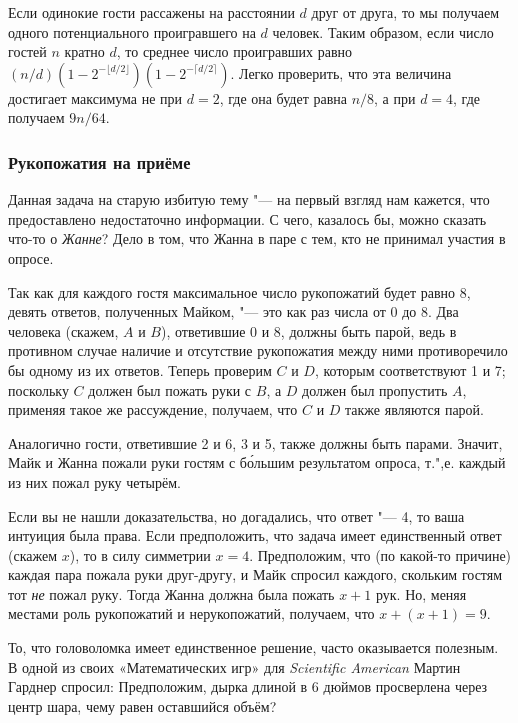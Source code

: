 \documentclass[twoside]{book}
\begin{document}
Если одинокие гости рассажены на расстоянии $d$ друг от друга, то мы получаем одного потенциального проигравшего на $d$ человек.
Таким образом, если число гостей $n$ кратно $d$, то среднее число проигравших равно $(n/d)(1-2^{-\lfloor d/2\rfloor})(1-2^{-\lceil d/2\rceil})$.
Легко проверить, что эта величина достигает максимума не при $d=2$, где она будет равна $n/8$, а при $d=4$, где получаем $9n/64$.
\heart

\subsubsection*{Рукопожатия на приёме}%

Данная задача на старую избитую тему "--- на первый взгляд нам кажется, что предоставлено недостаточно информации.
С чего, казалось бы, можно сказать что-то о \emph{Жанне}?
Дело в том, что Жанна в паре с тем, кто не принимал участия в опросе.

Так как для каждого гостя максимальное число рукопожатий будет равно 8, 
девять ответов, полученных Майком, "--- это как раз числа от 0 до 8.
Два человека (скажем, $A$ и $B$), ответившие 0 и 8, должны быть парой, ведь в противном случае наличие и отсутствие рукопожатия между ними противоречило бы одному из их ответов.
Теперь проверим $C$ и $D$, которым соответствуют 1 и 7;
поскольку $C$ должен был пожать руки с $B$, а $D$ должен был пропустить $A$, применяя такое же рассуждение, получаем, что $C$ и $D$ также являются парой.

Аналогично гости, ответившие 2 и 6, 3 и 5,
также должны быть парами.  Значит, Майк и Жанна пожали руки гостям с
б\'{о}льшим результатом опроса, т.",е. каждый из них пожал руку
четырём.  \heart

Если вы не нашли доказательства, но догадались, что ответ "--- 4, то ваша интуиция была права.
Если предположить, что задача имеет единственный ответ (скажем $x$), то в силу симметрии $x=4$.
Предположим, что (по какой-то причине) каждая пара пожала руки друг-другу, и Майк спросил каждого, скольким гостям тот \emph{не} пожал руку.
Тогда Жанна должна была пожать $x+1$ рук.
Но, меняя местами роль рукопожатий и нерукопожатий, получаем, что $x+(x+1)=9$.

То, что головоломка имеет единственное решение, часто оказывается полезным.
В одной из своих «Математических игр» для \emph{Scientific American} Мартин Гарднер спросил:
Предположим, дырка длиной в 6 дюймов просверлена через центр шара, чему равен оставшийся объём?
\end{document}
